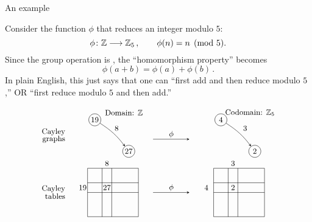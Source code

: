 \documentclass[8pt, handout]{beamer}
\newcommand{\Pause}{\pause}      %
\begin{document}
\begin{frame}{An example} %

  Consider the function $\phi$ that reduces an integer modulo $5$:
  \[
  \phi\colon\mathbb{Z}\longrightarrow\mathbb{Z}_5\,,\qquad \phi(n)=n\pmod{5}.
  \]
  \Pause Since the group operation is , the
  ``homomorphism property'' becomes
  \[
  \phi(a+b)=\phi(a)+\phi(b)\,.
  \]
  \Pause In plain English, this just says that one can ``first add and then
  reduce modulo $5$,'' OR ``first reduce modulo $5$ and then add.''

  \Pause\vspace{-3mm}

  \[
  \begin{tikzpicture}
  \tikzstyle{to} = [draw, -stealth]
  \tikzstyle{v} = [circle, draw,inner sep=0pt, minimum size=5mm]
  \tikzstyle{every node}=[font=\small]
    \node[anchor=east] at (-.8,1.15) {Cayley};
    \node[anchor=east] at (-.8,.85) {tables};
    \node[anchor=east] at (-.8,3.5) {Cayley};
    \node[anchor=east] at (-.8,3.2) {graphs};
    \node at (1.5,4.3) {Domain: $\Z$};
    \node (a) at (.3,4) [v] {$19$};
    \node (b) at (1.7,2.7) [v] {$27$};
    \draw[to,bend left=10] (a) to (b); 
    \node at (1.2,3.65) {$8$};
    \draw[thin] (0,0) rectangle (2.1,2);
    \draw[thin] (0,1) -- (2.1,1);
    \draw[thin] (0,1.4) -- (2.1,1.4);
    \draw[thin] (.6,0) -- (.6,2);
    \draw[thin] (1,0) -- (1,2);
    \node at (-.2,1.2) {$19$}; 
    \node at (.8,2.2) {$8$}; 
    \node at (.8,1.2) {$27$};
  \end{tikzpicture}
  \hspace{3mm}
  \begin{tikzpicture}
    \tikzstyle{to} = [draw, -stealth]
  \tikzstyle{v} = [circle, draw,inner sep=0pt, minimum size=5mm]
  \tikzstyle{every node}=[font=\small]
    \node at (1.5,4.3) {Codomain: $\Z_5$};
    \node (a) at (.3,4) [v] {$4$};
    \node (b) at (1.7,2.7) [v] {$2$};
    \draw[to,bend left=10] (a) to (b);
    \node at (1.3,3.65) {$3$};
    \draw[thin,-stealth] (-2.5,3.2) -- (-1,3.2);
    \node at (-1.75,3.4) {$\phi$};
    \draw[thin,-stealth] (-2.5,1) -- (-1,1);
    \node at (-1.75,1.2) {$\phi$};
    \draw[thin] (0,0) rectangle (2.1,2);
    \draw[thin] (0,1) -- (2.1,1);
    \draw[thin] (0,1.4) -- (2.1,1.4);
    \draw[thin] (.6,0) -- (.6,2);
    \draw[thin] (1,0) -- (1,2);
    \node at (-.3,1.2) {$4$}; 
    \node at (.8,2.2) {$3$}; 
    \node at (.8,1.2) {$2$};
  \end{tikzpicture}
  \]
  
\end{frame}
\end{document}
